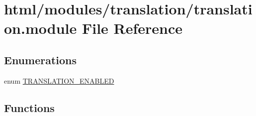 \hypertarget{translation_8module}{
\section{html/modules/translation/translation.module File Reference}
\label{translation_8module}
}
\subsection*{Enumerations}
\begin{DoxyCompactItemize}
\item 
enum \hyperlink{translation_8module_acfb8a3bb59249a565d8de62ec82f947e}{TRANSLATION\_\-ENABLED} 
\end{DoxyCompactItemize}
\subsection*{Functions}
